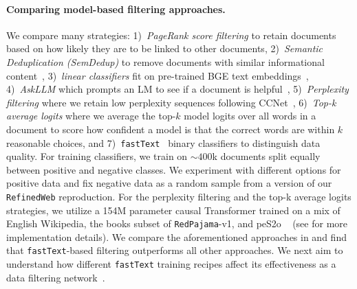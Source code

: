 \documentclass{article}
\newcommand{\rpj}{\texttt{RedPajama}\xspace}
\newcommand{\rw}{\texttt{RefinedWeb}\xspace}
\newcommand{\fasttext}{\texttt{fastText}\xspace}
\newcommand{\askllm}{AskLLM\xspace}
\begin{document}
\paragraph{Comparing model-based filtering approaches.}

We compare many strategies:
1)~\emph{PageRank score filtering} to retain documents based on how likely they are to be linked to other documents,
2)~\emph{Semantic Deduplication (SemDedup)} to remove documents with similar informational content~\citep{abbas2023semdedup},
3)~\emph{linear classifiers} fit on pre-trained BGE text embeddings~\citep{bge_embedding},
4)~\emph{\askllm} which prompts an LM to see if a document is helpful~\citep{sachdeva2024train},
5)~\emph{Perplexity filtering} where we retain low perplexity sequences following CCNet~\citep{wenzek-etal-2020-ccnet},
6)~\emph{Top-k average logits} where we average the top-$k$ model logits over all words in a document to score how confident a model is that the correct words are within $k$ reasonable choices,
and
7)~\fasttext~\citep{joulin2017bag} binary classifiers to distinguish data quality.
For training classifiers, we train on $\sim 400$k documents split equally between positive and negative classes.
We experiment with different options for positive data and fix negative data as a random sample from a version of our \rw reproduction.
For the perplexity filtering and the top-k average logits strategies, we utilize a 154M parameter causal Transformer trained on a mix of English Wikipedia, the books subset of \rpj-v1, and peS2o ~\citep{peS2o, rpj} (see  for more implementation details).
We compare the aforementioned approaches in  and find that \fasttext-based filtering outperforms all other approaches.
We next aim to understand how different \fasttext training recipes affect its effectiveness as a data filtering network~\citep{fang2023dfn}.
\end{document}
